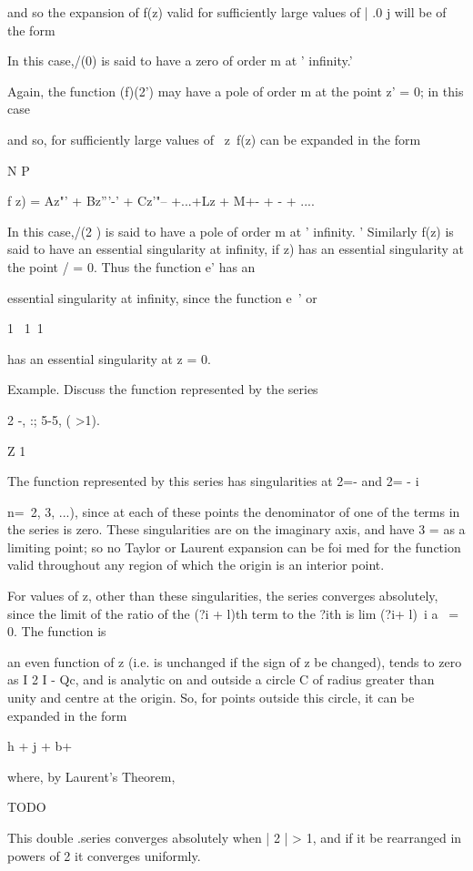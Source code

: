 {{{{and so the expansion of f(z) valid for sufficiently large values of |
.0 j will be of the form

In this case,/(0) is said to have a zero of order m at ' infinity.'

%
%

Again, the function (f)(2') may have a pole of order m at the point z'
= 0; in this case

and so, for sufficiently large values of \ z\, f(z) can be expanded in
the form

N P

f z) = Az"' + Bz'''-' + Cz'"-- +...+Lz + M+- + - + ....

In this case,/(2 ) is said to have a pole of order m at ' infinity. '
Similarly f(z) is said to have an essential singularity at infinity,
if z) has an essential singularity at the point / = 0. Thus the
function e' has an

essential singularity at infinity, since the function e~' or

1 \ 1\ 1

has an essential singularity at z = 0.

Example. Discuss the function represented by the series

2 -, :; 5-5, ( >1).

Z 1

The function represented by this series has singularities at 2=- and
2= - i

 n=\, 2, 3, ...), since at each of these points the denominator of one
of the terms in the series is zero. These singularities are on the
imaginary axis, and have 3 = as a limiting point; so no Taylor or
Laurent expansion can be foi med for the function valid throughout any
region of which the origin is an interior point.

For values of z, other than these singularities, the series converges
absolutely, since the limit of the ratio of the (?i + l)th term to the
?ith is lim (?i+ l)~i a~ = 0. The function is

an even function of z (i.e. is unchanged if the sign of z be changed),
tends to zero as I 2 I - Qc, and is analytic on and outside a circle
C of radius greater than unity and centre at the origin. So, for
points outside this circle, it can be expanded in the form

h + j + b+

where, by Laurent's Theorem,

TODO

This double .series converges absolutely when | 2 | > 1, and if it be
rearranged in powers of 2 it converges uniformly.

}}}}
